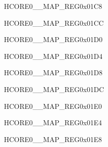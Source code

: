 \begin{register}{H}{CORE0\_\_MAP\_REG}{0x01C8}\label{regdesc:CORE0HPPARLIOTXINTMAPREG}
\end{register}\vspace{-3em}


\begin{register}{H}{CORE0\_\_MAP\_REG}{0x01CC}\label{regdesc:CORE0H264DMA2DOUTCH0INTMAPREG}
\end{register}\vspace{-3em}


\begin{register}{H}{CORE0\_\_MAP\_REG}{0x01D0}\label{regdesc:CORE0H264DMA2DOUTCH1INTMAPREG}
\end{register}\vspace{-3em}


\begin{register}{H}{CORE0\_\_MAP\_REG}{0x01D4}\label{regdesc:CORE0H264DMA2DOUTCH2INTMAPREG}
\end{register}\vspace{-3em}


\begin{register}{H}{CORE0\_\_MAP\_REG}{0x01D8}\label{regdesc:CORE0H264DMA2DOUTCH3INTMAPREG}
\end{register}\vspace{-3em}


\begin{register}{H}{CORE0\_\_MAP\_REG}{0x01DC}\label{regdesc:CORE0H264DMA2DOUTCH4INTMAPREG}
\end{register}\vspace{-3em}


\begin{register}{H}{CORE0\_\_MAP\_REG}{0x01E0}\label{regdesc:CORE0H264DMA2DINCH0INTMAPREG}
\end{register}\vspace{-3em}


\begin{register}{H}{CORE0\_\_MAP\_REG}{0x01E4}\label{regdesc:CORE0H264DMA2DINCH1INTMAPREG}
\end{register}\vspace{-3em}


\begin{register}{H}{CORE0\_\_MAP\_REG}{0x01E8}\label{regdesc:CORE0H264DMA2DINCH2INTMAPREG}
\end{register}\vspace{-3em}


